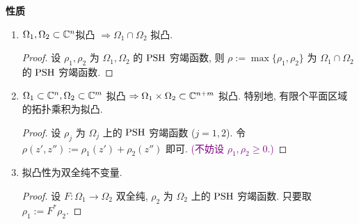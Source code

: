 \noindent\textbf{性质} 
\begin{enumerate}[(1)]
    \item $\Omega _1,\Omega _2 \subset {\mathbb C}^n$拟凸 $\Rightarrow \Omega _1 \cap \Omega _2$ 拟凸.  
    \begin{proof}
        设 $\rho _1, \rho _2$ 为 $\Omega _1,\Omega _2$ 的 $\operatorname{PSH}$  穷竭函数, 则 $\rho :=\max \{\rho _1,\rho _2\}$ 为 $\Omega _1 \cap \Omega _2$ 的 $\operatorname{PSH}$ 穷竭函数.   
    \end{proof}
    \item $\Omega _1 \subset {\mathbb C}^n, \Omega _2 \subset {\mathbb C}^m$ 拟凸 $\Rightarrow \Omega _1 \times \Omega _2 \subset {\mathbb C}^{n+m}$ 拟凸.  特别地, 有限个平面区域的拓扑乘积为拟凸. 
    \begin{proof}
        设 $\rho _j$ 为 $\Omega _j$ 上的 $\operatorname{PSH}$ 穷竭函数 ($j=1,2$). 令 $\rho (z',z''):=\rho_1 (z')+\rho_2 (z'')$ 即可. \textcolor{purple}{(不妨设 $\rho _1, \rho _2 \geq 0$.)}    
    \end{proof}
    \item 拟凸性为双全纯不变量.
    \begin{proof}
        设 $F: \Omega _1 \to \Omega _2$ 双全纯, $\rho _2$ 为 $\Omega _2$ 上的 $\operatorname{PSH}$ 穷竭函数. 只要取 $\rho _1:=F^{*} \rho _2$.    
    \end{proof}
\end{enumerate}

